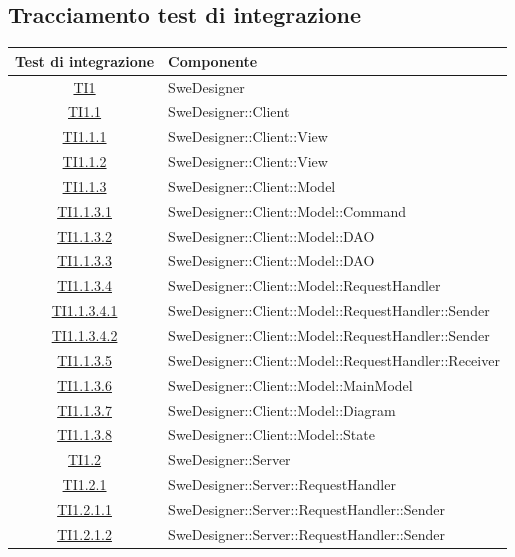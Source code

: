 \documentclass[../PianoDiQualifica.tex]{subfiles}
\begin{document}
	\subsection{Tracciamento test di integrazione}
	\normalsize
	\begin{longtable}{|c|l|}
		\hline
		\textbf{Test di integrazione} & \textbf{Componente}\\
		\hline
		\endhead
		\hyperlink{TI1}{TI1} & SweDesigner \\
		\hline
		\hyperlink{TI1.1}{TI1.1} & SweDesigner::Client \\
		\hline
		\hyperlink{TI1.1.1}{TI1.1.1} & SweDesigner::Client::View \\
		\hline
		\hyperlink{TI1.1.2}{TI1.1.2} & SweDesigner::Client::View \\
		\hline
		\hyperlink{TI1.1.3}{TI1.1.3} & SweDesigner::Client::Model \\
		\hline
		\hyperlink{TI1.1.3.1}{TI1.1.3.1} & SweDesigner::Client::Model::Command \\
		\hline
		\hyperlink{TI1.1.3.2}{TI1.1.3.2} & SweDesigner::Client::Model::DAO \\
		\hline
		\hyperlink{TI1.1.3.3}{TI1.1.3.3} & SweDesigner::Client::Model::DAO \\
		\hline
		\hyperlink{TI1.1.3.4}{TI1.1.3.4} & SweDesigner::Client::Model::RequestHandler \\
		\hline
		\hyperlink{TI1.1.3.4.1}{TI1.1.3.4.1} & SweDesigner::Client::Model::RequestHandler::Sender \\
		\hline
		\hyperlink{TI1.1.3.4.2}{TI1.1.3.4.2} & SweDesigner::Client::Model::RequestHandler::Sender \\
		\hline
		\hyperlink{TI1.1.3.5}{TI1.1.3.5} & SweDesigner::Client::Model::RequestHandler::Receiver \\
		\hline
		\hyperlink{TI1.1.3.6}{TI1.1.3.6} & SweDesigner::Client::Model::MainModel \\
		\hline
		\hyperlink{TI1.1.3.7}{TI1.1.3.7} & SweDesigner::Client::Model::Diagram \\
		\hline
		\hyperlink{TI1.1.3.8}{TI1.1.3.8} & SweDesigner::Client::Model::State \\
		\hline
		\hyperlink{TI1.2}{TI1.2} & SweDesigner::Server \\
		\hline
		\hyperlink{TI1.2.1}{TI1.2.1} & SweDesigner::Server::RequestHandler \\
		\hline
		\hyperlink{TI1.2.1.1}{TI1.2.1.1} & SweDesigner::Server::RequestHandler::Sender \\
		\hline
		\hyperlink{TI1.2.1.2}{TI1.2.1.2} & SweDesigner::Server::RequestHandler::Sender \\

\end{longtable}
\end{document}

